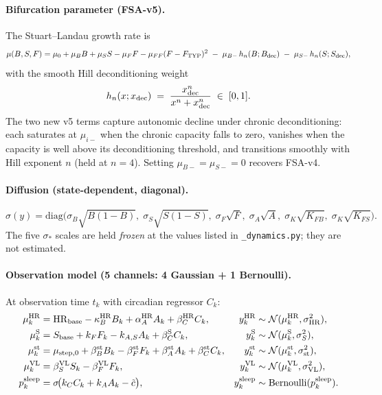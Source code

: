 \paragraph{Bifurcation parameter (FSA-v5).} The Stuart--Landau growth rate is
\begin{equation}
\mu(B, S, F) = \mu_0 + \mu_B B + \mu_S S - \mu_F F - \mu_{FF}(F - F_{\rm TYP})^2 \;-\; \mu_{B-}\, h_n(B; B_{\rm dec}) \;-\; \mu_{S-}\, h_n(S; S_{\rm dec}),
\label{eq:v5-mu}
\end{equation}
with the smooth Hill deconditioning weight
\begin{equation}
h_n(x; x_{\rm dec}) \;=\; \frac{x_{\rm dec}^n}{x^n + x_{\rm dec}^n} \;\in\; [0, 1].
\end{equation}
The two new v5 terms capture autonomic decline under chronic deconditioning: each saturates at $\mu_{i-}$ when the chronic capacity falls to zero, vanishes when the capacity is well above its deconditioning threshold, and transitions smoothly with Hill exponent $n$ (held at $n=4$). Setting $\mu_{B-} = \mu_{S-} = 0$ recovers FSA-v4.

\paragraph{Diffusion (state-dependent, diagonal).}
\begin{equation}
\sigma(y) = \mathrm{diag}\Big(
  \sigma_B \sqrt{B(1-B)},\;
  \sigma_S \sqrt{S(1-S)},\;
  \sigma_F \sqrt{F},\;
  \sigma_A \sqrt{A},\;
  \sigma_K \sqrt{K_{FB}},\;
  \sigma_K \sqrt{K_{FS}}
\Big).
\end{equation}
The five $\sigma_*$ scales are held \emph{frozen} at the values listed in \texttt{\_dynamics.py}; they are not estimated.

\paragraph{Observation model (5 channels: 4 Gaussian + 1 Bernoulli).} At observation time $t_k$ with circadian regressor $C_k$:
\begin{align}
\mu^{\rm HR}_k &= {\rm HR}_{\rm base} - \kappa_B^{\rm HR} B_k + \alpha_A^{\rm HR} A_k + \beta_C^{\rm HR} C_k,
   & y^{\rm HR}_k &\sim \mathcal{N}(\mu^{\rm HR}_k, \sigma_{\rm HR}^2), \\
\mu^{\rm S}_k  &= S_{\rm base} + k_F F_k - k_{A,S} A_k + \beta_C^{\rm S} C_k,
   & y^{\rm S}_k  &\sim \mathcal{N}(\mu^{\rm S}_k, \sigma_S^2), \\
\mu^{\rm st}_k &= \mu_{\rm step,0} + \beta_B^{\rm st} B_k - \beta_F^{\rm st} F_k + \beta_A^{\rm st} A_k + \beta_C^{\rm st} C_k,
   & y^{\rm st}_k &\sim \mathcal{N}(\mu^{\rm st}_k, \sigma_{\rm st}^2), \\
\mu^{\rm VL}_k &= \beta_S^{\rm VL} S_k - \beta_F^{\rm VL} F_k,
   & y^{\rm VL}_k &\sim \mathcal{N}(\mu^{\rm VL}_k, \sigma_{\rm VL}^2), \\
p^{\rm sleep}_k &= \sigma\!\big(k_C C_k + k_A A_k - \tilde c\big),
   & y^{\rm sleep}_k &\sim \mathrm{Bernoulli}(p^{\rm sleep}_k).
\end{align}

